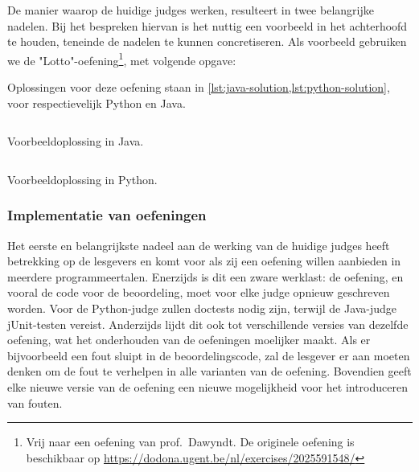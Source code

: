 De manier waarop de huidige judges werken, resulteert in twee belangrijke nadelen.
Bij het bespreken hiervan is het nuttig een voorbeeld in het achterhoofd te houden, teneinde de nadelen te kunnen concretiseren.
Als voorbeeld gebruiken we de "Lotto"-oefening\footnote{Vrij naar een oefening van prof.\ Dawyndt. De originele oefening is beschikbaar op \url{https://dodona.ugent.be/nl/exercises/2025591548/}}, met volgende opgave:

\begin{quote}
\end{quote}

Oplossingen voor deze oefening staan in \cref{lst:java-solution,lst:python-solution}, voor respectievelijk Python en Java.

\begin{listing}
    \inputminted{java}{../../exercise/lotto/solution/correct.java}
    \caption{Voorbeeldoplossing in Java.}
    \label{lst:java-solution}
\end{listing}

\begin{listing}
    \inputminted{python3}{../../exercise/lotto/solution/correct.py}
    \caption{Voorbeeldoplossing in Python.}
    \label{lst:python-solution}
\end{listing}

\subsubsection{Implementatie van oefeningen}

Het eerste en belangrijkste nadeel aan de werking van de huidige judges heeft betrekking op de lesgevers en komt voor als zij een oefening willen aanbieden in meerdere programmeertalen.
Enerzijds is dit een zware werklast: de oefening, en vooral de code voor de beoordeling, moet voor elke judge opnieuw geschreven worden.
Voor de Python-judge zullen doctests nodig zijn, terwijl de Java-judge jUnit-testen vereist.
Anderzijds lijdt dit ook tot verschillende versies van dezelfde oefening, wat het onderhouden van de oefeningen moelijker maakt.
Als er bijvoorbeeld een fout sluipt in de beoordelingscode, zal de lesgever er aan moeten denken om de fout te verhelpen in alle varianten van de oefening.
Bovendien geeft elke nieuwe versie van de oefening een nieuwe mogelijkheid voor het introduceren van fouten.

